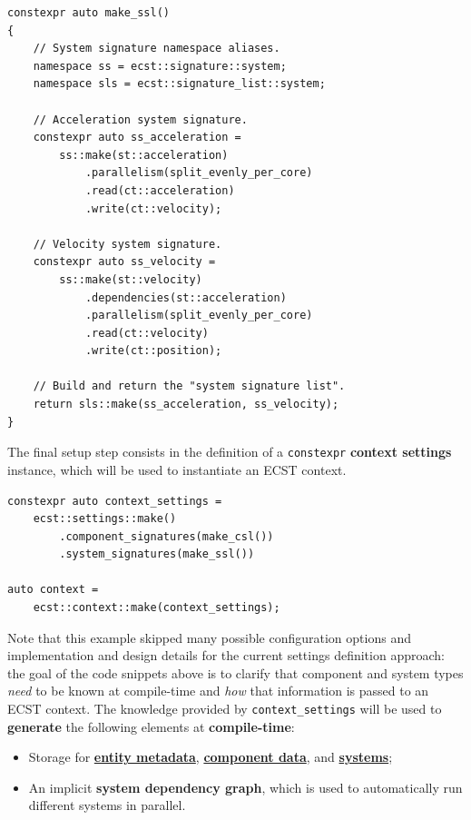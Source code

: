 \documentclass[twoside, 12pt, a4paper, openright]{book}
\begin{document}
\begin{verbatim}
constexpr auto make_ssl()
{
    // System signature namespace aliases.
    namespace ss = ecst::signature::system;
    namespace sls = ecst::signature_list::system;

    // Acceleration system signature.
    constexpr auto ss_acceleration =
        ss::make(st::acceleration)
            .parallelism(split_evenly_per_core)
            .read(ct::acceleration)
            .write(ct::velocity);

    // Velocity system signature.
    constexpr auto ss_velocity =
        ss::make(st::velocity)
            .dependencies(st::acceleration)
            .parallelism(split_evenly_per_core)
            .read(ct::velocity)
            .write(ct::position);

    // Build and return the "system signature list".
    return sls::make(ss_acceleration, ss_velocity);
}
\end{verbatim}

The final setup step consists in the definition of a
\texttt{constexpr}
\textbf{context settings} instance, which will be used to instantiate an
ECST context.

\begin{verbatim}
constexpr auto context_settings =
    ecst::settings::make()
        .component_signatures(make_csl())
        .system_signatures(make_ssl())

auto context =
    ecst::context::make(context_settings);
\end{verbatim}

Note that this example skipped many possible configuration options and
implementation and design details for the current settings definition
approach: the goal of the code snippets above is to clarify that
component and system types \emph{need} to be known at compile-time and
\emph{how} that information is passed to an ECST context. The knowledge
provided by
\texttt{context_settings}
will be used to \textbf{generate} the following elements at
\textbf{compile-time}:

\begin{itemize}
\item
  Storage for \protect\hyperlink{storage_entity}{\textbf{entity
  metadata}}, \protect\hyperlink{storage_component}{\textbf{component
  data}}, and \protect\hyperlink{storage_system}{\textbf{systems}};
\item
  An implicit \textbf{system dependency graph}, which is used to
  automatically run different systems in parallel.
\end{itemize}
\end{document}
